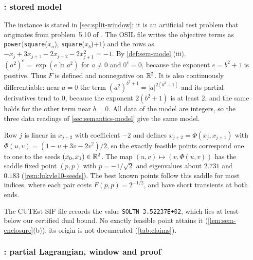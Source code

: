 \subsubsection{: stored model}\label{app:lukvle10-model}

The instance  is stated in \cref{sec:split-window}; it is an artificial test problem that originates from problem~5.10 of \citet{luksan1999-test-problems-for-unconstrained-optimization}.
The OSIL file writes the objective terms as \texttt{power}(\texttt{square}($x_a$), \texttt{square}($x_b$)$+1$) and the rows as $-x_j+3x_{j+1}-2x_{j+2}-2x_{j+1}^2=-1$.
By \cref{def:sem-model}(iii), $(a^2)^{e}=\exp(e\ln a^2)$ for $a\neq0$ and $0^{e}=0$, because the exponent $e=b^2+1$ is positive.
Thus $F$ is defined and nonnegative on $\mathbb{R}^2$.
It is also continuously differentiable: near $a=0$ the term $(a^2)^{b^2+1}=|a|^{2(b^2+1)}$ and its partial derivatives tend to $0$, because the exponent $2(b^2+1)$ is at least $2$, and the same holds for the other term near $b=0$.
All data of the model are integers, so the three data readings of \cref{sec:semantics-model} give the same model.

Row $j$ is linear in $x_{j+2}$ with coefficient $-2$ and defines $x_{j+2}=\Phi(x_j,x_{j+1})$ with $\Phi(u,v)=(1-u+3v-2v^2)/2$, so the exactly feasible points correspond one to one to the seeds $(x_0,x_1)\in\mathbb{R}^2$.
The map $(u,v)\mapsto(v,\Phi(u,v))$ has the saddle fixed point $(p,p)$ with $p=-1/\sqrt2$ and eigenvalues about $2.731$ and $0.183$ (\cref{rem:lukvle10-seeds}).
The best known points follow this saddle for most indices, where each pair costs $F(p,p)=2^{-1/2}$, and have short transients at both ends.

The CUTEst SIF file records the value \texttt{SOLTN 3.52237E+02}, which lies at least  below our certified dual bound.
No exactly feasible point attains it (\cref{lem:sem-enclosure}(b)); its origin is not documented (\cref{tab:claims}).

\subsubsection{: partial Lagrangian, window and proof}\label{app:lukvle10-proof}

